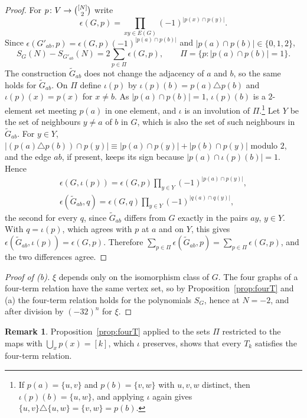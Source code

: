 \documentclass[11pt,a4paper,reqno]{amsart}
\theoremstyle{definition}
\newtheorem{remark}[theorem]{Remark}
\newcommand{\binomset}[2]{\tbinom{#1}{#2}}
\begin{document}
\begin{proof}
For $p\colon V\to\binomset{[N]}{2}$ write
\[
\epsilon(G,p)=\prod_{xy\in E(G)}(-1)^{|p(x)\cap p(y)|}.
\]
Since $\epsilon(G'_{ab},p)=\epsilon(G,p)(-1)^{|p(a)\cap p(b)|}$ and $|p(a)\cap p(b)|\in\{0,1,2\}$,
\[
S_G(N)-S_{G'_{ab}}(N)=2\sum_{p\in\Pi}\epsilon(G,p),\qquad \Pi=\{p:|p(a)\cap p(b)|=1\}.
\]
The construction $\widetilde G_{ab}$ does not change the adjacency of $a$ and $b$, so the same holds for $\widetilde G_{ab}$. On $\Pi$ define $\iota(p)$ by $\iota(p)(b)=p(a)\triangle p(b)$ and $\iota(p)(x)=p(x)$ for $x\ne b$. As $|p(a)\cap p(b)|=1$, $\iota(p)(b)$ is a $2$-element set meeting $p(a)$ in one element, and $\iota$ is an involution of $\Pi$.\footnote{If $p(a)=\{u,v\}$ and $p(b)=\{v,w\}$ with $u,v,w$ distinct, then $\iota(p)(b)=\{u,w\}$, and applying $\iota$ again gives $\{u,v\}\triangle\{u,w\}=\{v,w\}=p(b)$.} Let $Y$ be the set of neighbours $y\ne a$ of $b$ in $G$, which is also the set of such neighbours in $\widetilde G_{ab}$. For $y\in Y$, $|(p(a)\triangle p(b))\cap p(y)|\equiv|p(a)\cap p(y)|+|p(b)\cap p(y)|$ modulo $2$, and the edge $ab$, if present, keeps its sign because $|p(a)\cap\iota(p)(b)|=1$. Hence
\begin{gather*}
\epsilon(G,\iota(p))=\epsilon(G,p)\prod_{y\in Y}(-1)^{|p(a)\cap p(y)|},\\
\epsilon(\widetilde G_{ab},q)=\epsilon(G,q)\prod_{y\in Y}(-1)^{|q(a)\cap q(y)|},
\end{gather*}
the second for every $q$, since $\widetilde G_{ab}$ differs from $G$ exactly in the pairs $ay$, $y\in Y$. With $q=\iota(p)$, which agrees with $p$ at $a$ and on $Y$, this gives $\epsilon(\widetilde G_{ab},\iota(p))=\epsilon(G,p)$. Therefore $\sum_{p\in\Pi}\epsilon(\widetilde G_{ab},p)=\sum_{p\in\Pi}\epsilon(G,p)$, and the two differences agree.
\end{proof}

\begin{proof}[Proof of (b)]
$\xi$ depends only on the isomorphism class of $G$. The four graphs of a four-term relation have the same vertex set, so by Proposition~\ref{prop:fourT} and (a) the four-term relation holds for the polynomials $S_G$, hence at $N=-2$, and after division by $(-32)^n$ for $\xi$.
\end{proof}

\begin{remark}\label{rem:Tk}
Proposition~\ref{prop:fourT} applied to the sets $\Pi$ restricted to the maps with $\bigcup_xp(x)=[k]$, which $\iota$ preserves, shows that every $T_k$ satisfies the four-term relation.
\end{remark}
\end{document}
